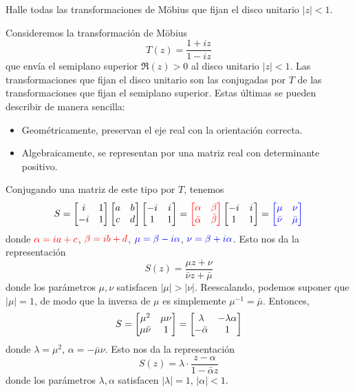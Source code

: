\begin{exercise}
Halle todas las transformaciones de Möbius que fijan el disco unitario $|z| < 1$.
\end{exercise}

\begin{solution}
Consideremos la transformación de Möbius
$$T(z) = \frac {1 + iz} {1 - iz}$$
que envía el semiplano superior $\Re(z) > 0$ al disco unitario $|z| < 1$. Las transformaciones que fijan el disco unitario son las conjugadas por $T$ de las transformaciones que fijan el semiplano superior. Estas últimas se pueden describir de manera sencilla:
\begin{itemize}
    \item Geométricamente, preservan el eje real con la orientación correcta.
    \item Algebraicamente, se representan por una matriz real con determinante positivo.
\end{itemize}
Conjugando una matriz de este tipo por $T$, tenemos
$$
S
    = \begin{bmatrix} i & 1 \\ -i & 1 \end{bmatrix} \begin{bmatrix} a & b \\ c & d \end{bmatrix} \begin{bmatrix} -i & i \\ 1 & 1 \end{bmatrix}
    = \textcolor {red} {\begin{bmatrix} \alpha & \beta \\ \bar \alpha & \bar \beta \end{bmatrix}} \begin{bmatrix} -i & i \\ 1 & 1 \end{bmatrix}
    = \textcolor {blue} {\begin{bmatrix} \mu & \nu \\ \bar \nu & \bar \mu \end{bmatrix}}
$$
donde $\textcolor {red} {\alpha = ia + c}$, $\textcolor {red} {\beta = ib + d}$, $\textcolor {blue} {\mu = \beta - i\alpha}$, $\textcolor {blue} {\nu = \beta + i\alpha}$. Esto nos da la representación
$$S(z) = \frac {\mu z + \nu} {\bar \nu z + \bar \mu}$$
donde los parámetros $\mu, \nu$ satisfacen $|\mu| > |\nu|$. Reescalando, podemos suponer que $|\mu| = 1$, de modo que la inversa de $\mu$ es simplemente $\mu^{-1} = \bar \mu$. Entonces,
$$
S
    = \begin{bmatrix} \mu^2 & \mu \nu \\ \mu \bar \nu & 1  \end{bmatrix}
    = \begin{bmatrix} \lambda & -\lambda \alpha \\ -\bar \alpha & 1  \end{bmatrix}
$$
donde $\lambda = \mu^2$, $\alpha = -\bar \mu \nu$. Esto nos da la representación
$$S(z) = \lambda \cdot \frac {z - \alpha} {1 - \bar \alpha z}$$
donde los parámetros $\lambda, \alpha$ satisfacen $|\lambda| = 1$, $|\alpha| < 1$.
\end{solution}
